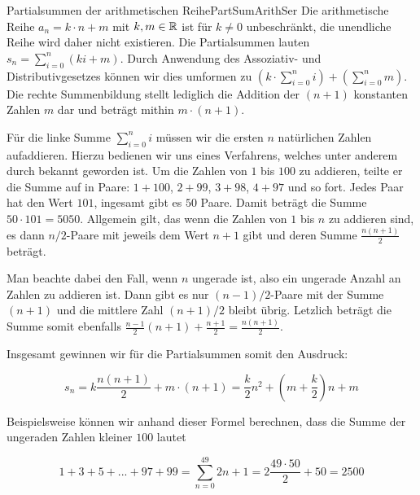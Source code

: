 \begin{example}{Partialsummen der arithmetischen Reihe}{PartSumArithSer}
	Die arithmetische Reihe $a_n = k\cdot n+m$ mit $k,m\in\mathbb{R}$ ist für $k \ne 0$ unbeschränkt, die unendliche Reihe wird daher nicht existieren. Die Partialsummen lauten $s_n = \sum\limits_{i=0}^n (ki+m)$. Durch Anwendung des Assoziativ- und Distributivgesetzes können wir dies umformen zu $\left(k\cdot\sum\limits_{i=0}^n i\right) + \left(\sum\limits_{i=0}^n m\right)$. Die rechte Summenbildung stellt lediglich die Addition der $(n+1)$ konstanten Zahlen $m$ dar und beträgt mithin $m\cdot(n+1)$.

	Für die linke Summe $\sum\limits_{i=0}^n i$ müssen wir die ersten $n$ natürlichen Zahlen aufaddieren. Hierzu bedienen wir uns eines Verfahrens, welches unter anderem durch  bekannt geworden ist. Um die Zahlen von $1$ bis $100$ zu addieren, teilte er die Summe auf in Paare: $1+100$, $2+99$, $3+98$, $4+97$ und so fort. Jedes Paar hat den Wert $101$, ingesamt gibt es $50$ Paare. Damit beträgt die Summe $50\cdot 101 = 5050$. Allgemein gilt, das wenn die Zahlen von $1$ bis $n$ zu addieren sind, es dann $n/2$-Paare mit jeweils dem Wert $n+1$ gibt und deren Summe $\frac{n(n+1)}{2}$ beträgt.

	Man beachte dabei den Fall, wenn $n$ ungerade ist, also ein ungerade Anzahl an Zahlen zu addieren ist. Dann gibt es nur $(n-1)/2$-Paare mit der Summe $(n+1)$ und die mittlere Zahl $(n+1)/2$ bleibt übrig. Letzlich beträgt die Summe somit ebenfalls $\frac{n-1}{2}(n+1)+\frac{n+1}{2} = \frac{n(n+1)}{2}$.

	Insgesamt gewinnen wir für die Partialsummen somit den Ausdruck:

	\begin{equation}
	  s_n = k \frac{n(n+1)}{2} + m\cdot(n+1) = \frac{k}{2}n^2 + \left(m+\frac{k}{2}\right)n + m
	\end{equation}

	Beispielsweise können wir anhand dieser Formel berechnen, dass die Summe der ungeraden Zahlen kleiner $100$ lautet

	$$
	  1+3+5+...+97+99 = \sum\limits_{n=0}^{49} 2n+1 = 2\frac{49\cdot 50}{2} + 50 = 2500
	$$
\end{example}


